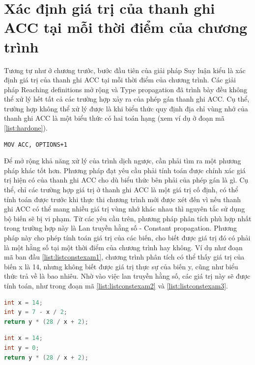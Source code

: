 \section{Xác định giá trị của thanh ghi ACC tại mỗi thời điểm của chương trình}
Tương tự như ở chương trước, bước đầu tiên của giải pháp Suy luận kiểu là xác định giá trị của thanh ghi ACC tại mỗi thời điểm của chương trình. Các giải pháp Reaching definitions mở rộng và Type propagation đã trình bày đều không thể xử lý hết tất cả các trường hợp xảy ra của phép gán thanh ghi ACC. Cụ thể, trường hợp không thể xử lý được là khi biểu thức quy định địa chỉ vùng nhớ của thanh ghi ACC là một biểu thức có hai toán hạng (xem ví dụ ở đoạn mã \ref{list:hardone}). 
\begin{lstlisting}[caption={Trường hợp không thể xử lý được bằng các phương pháp phân tích dữ liệu trước},label={list:hardone}]
MOV ACC, OPTIONS+1
\end{lstlisting}
Để mở rộng khả năng xử lý của trình dịch ngược, cần phải tìm ra một phương pháp khác tốt hơn. Phương pháp đạt yêu cầu phải tính toán được chính xác giá trị hiện có của thanh ghi ACC cho dù biểu thức bên phải của phép gán là gì. Cụ thể, chỉ các trường hợp giá trị ở thanh ghi ACC là một giá trị cố định, có thể tính toán được trước khi thực thi chương trình mới được xét đến vì nếu thanh ghi ACC có thể mang nhiều giá trị vùng nhớ khác nhau thì nguyên tắc sử dụng bộ biến sẽ bị vi phạm. Từ các yêu cầu trên, phương pháp phân tích phù hợp nhất trong trường hợp này là Lan truyền hằng số - Constant propagation. Phương pháp này cho phép tính toán giá trị của các biến, cho biết được giá trị đó có phải là một hằng số tại một thời điểm của chương trình hay không. Ví dụ như đoạn mã ban đầu \ref{list:listconstexam1}, chương trình phân tích có thể thấy giá trị của biến x là 14, nhưng không biết được giá trị thực sự của biến y, cũng như biểu thức trả về là bao nhiêu. Nhờ vào việc lan truyền hằng số, các giá trị này sẽ được tính toán, như trong đoạn mã \ref{list:listconstexam2} và \ref{list:listconstexam3}.
\begin{lstlisting}[caption={Đoạn mã trước khi thực hiện lan truyền hằng số},label={list:listconstexam1}, language=c++]
 int x = 14;
int y = 7 - x / 2;
return y * (28 / x + 2);
\end{lstlisting}
\begin{lstlisting}[caption={Đoạn mã sau khi thực hiện lan truyền hằng số cho biến y},label={list:listconstexam2}, language=c++]
int x = 14;
int y = 0;
return y * (28 / x + 2);
\end{lstlisting}
